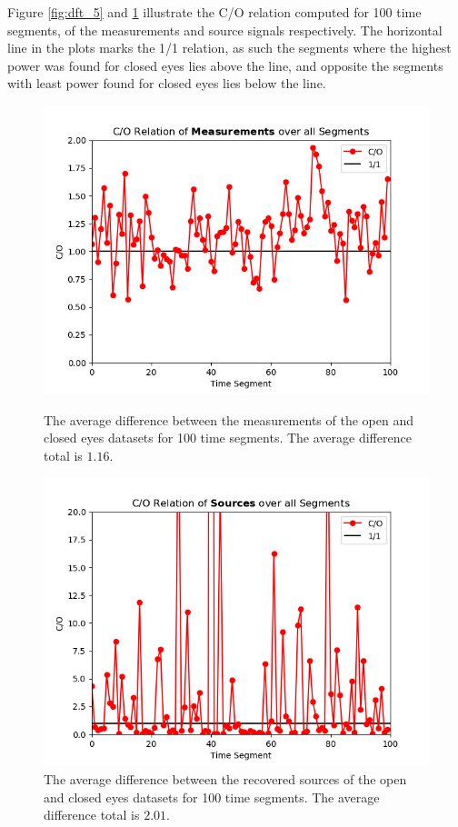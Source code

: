 Figure \ref{fig:dft_5} and \ref{fig:dft_6} illustrate the C/O relation computed for 100 time segments, of the measurements and source signals respectively. The horizontal line in the plots marks the 1/1 relation, as such the segments where the highest power was found for closed eyes lies above the line, and opposite the segments with least power found for closed eyes lies below the line.      
\begin{figure}[H]
\begin{widepage}
    \begin{minipage}[t]{.49\textwidth}
\centering
\includegraphics[width=1\linewidth]{figures/ch_7/DFT_Y_Difference.png}
\caption{The average difference between the measurements of the open and closed eyes datasets for 100 time segments. The average difference total is $1.16$.}
\label{fig:dft_5}
\end{minipage} 
\hspace{.5cm}
\begin{minipage}[t]{.49\textwidth}
\centering
\includegraphics[width=1\linewidth]{figures/ch_7/DFT_X_Difference.png}
\caption{The average difference between the recovered sources of the open and closed eyes datasets for 100 time segments. The average difference total is $2.01$.}
	\label{fig:dft_6}
    \end{minipage}
\end{widepage}
\end{figure}
